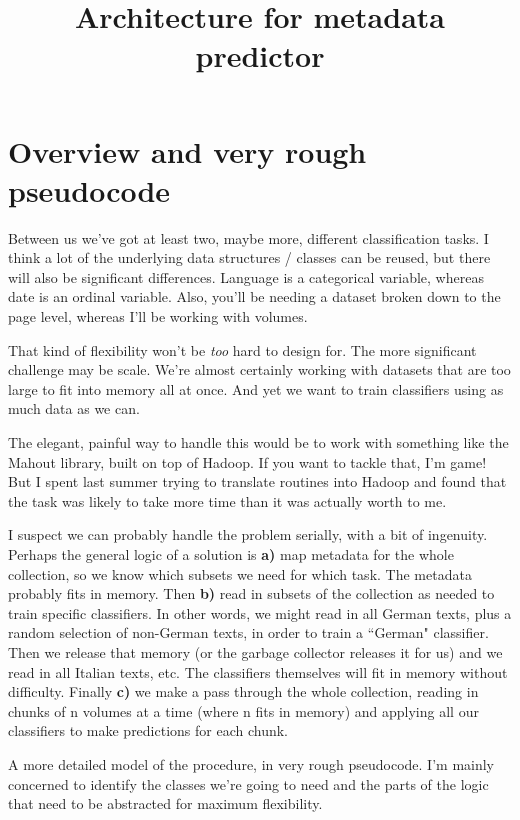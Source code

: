\documentclass[12pt]{article}
\title{Architecture for metadata predictor}
\author{}
\begin{document}
\maketitle

\section{Overview and very rough pseudocode}

Between us we've got at least two, maybe more, different classification tasks. I think a lot of the underlying data structures / classes can be reused, but there will also be significant differences. Language is a categorical variable, whereas date is an ordinal variable. Also, you'll be needing a dataset broken down to the page level, whereas I'll be working with volumes.

That kind of flexibility won't be \emph{too} hard to design for. The more significant challenge may be scale. We're almost certainly working with datasets that are too large to fit into memory all at once. And yet we want to train classifiers using as much data as we can.

The elegant, painful way to handle this would be to work with something like the Mahout library, built on top of Hadoop. If you want to tackle that, I'm game! But I spent last summer trying to translate routines into Hadoop and found that the task was likely to take more time than it was actually worth to me.

I suspect we can probably handle the problem serially, with a bit of ingenuity. Perhaps the general logic of a solution is \textbf{a)} map metadata for the whole collection, so we know which subsets we need for which task. The metadata probably fits in memory. Then \textbf{b)} read in subsets of the collection as needed to train specific classifiers. In other words, we might read in all German texts, plus a random selection of non-German texts, in order to train a ``German" classifier. Then we release that memory (or the garbage collector releases it for us) and we read in all Italian texts, etc. The classifiers themselves will fit in memory without difficulty. Finally \textbf{c)} we make a pass through the whole collection, reading in chunks of n volumes at a time (where n fits in memory) and applying all our classifiers to make predictions for each chunk.

A more detailed model of the procedure, in very rough pseudocode. I'm mainly concerned to identify the classes we're going to need and the parts of the logic that need to be abstracted for maximum flexibility.
\end{document}
